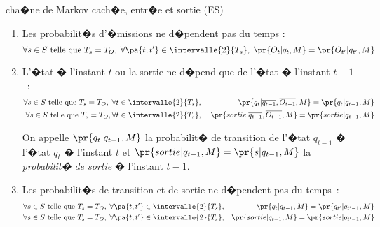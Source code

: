 \begin{xdefinition}{cha�ne de Markov cach�e, entr�e et sortie (ES)}
\begin{enumerate}
                \item Les probabilit�s d'�missions ne d�pendent pas du temps :
                    $$
                    \forall s \in S \text{ telle que } T_s = T_O, \; 
                    \forall \pa{t,t'} \in \intervalle{2}{T_s}, \; \pr{O_t|q_t,M} = \pr{O_{t'}|q_{t'},M}
                    $$
                    
                \item L'�tat � l'instant $t$ ou la sortie ne d�pend que de l'�tat � l'instant $t-1$~:
                    \begin{eqnarray*}
                    \forall s \in S \text{ telle que } T_s = T_O, \; \forall t \in \intervalle{2}{T_s}, \; &&
                                \pr{q_t| \overline{q_{t-1}},\overline{O_{t-1}},M} = \pr{q_t|q_{t-1},M} \\
                    \forall s \in S \text{ telle que } T_s = T_O, \forall t \in \intervalle{2}{T_s}, \; &&
                                \pr{ sortie | \overline{q_{t-1}},\overline{O_{t-1}},M} = \pr{sortie |q_{t-1},M}
                    \end{eqnarray*}
                    
                    On appelle $\pr{q_t|q_{t-1},M}$ la probabilit� de transition de l'�tat $q_{t-1}$ � l'�tat $q_t$ � l'instant $t$ et
                    $\pr{sortie|q_{t-1},M} = \pr{s|q_{t-1},M}$ la \emph{probabilit� de sortie} � l'instant $t-1$.
                    
                \item Les probabilit�s de transition et de sortie ne d�pendent pas du temps~:
                    \begin{eqnarray*}
                    \forall s \in S \text{ telle que } T_s = T_O, \; \forall \pa{t,t'} \in \intervalle{2}{T_s}, && 
                                        \pr{q_t|q_{t-1},M} = \pr{q_{t'}|q_{t'-1},M} \\
                    \forall s \in S \text{ telle que } T_s = T_O, \; \forall \pa{t,t'} \in \intervalle{2}{T_s}, && 
                                        \pr{sortie|q_{t-1},M} = \pr{sortie|q_{t'-1},M}
                    \end{eqnarray*}
                    
                \end{enumerate}
        
        \end{xdefinition}



